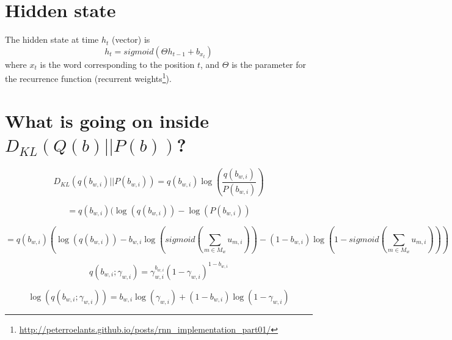 \documentclass[11pt]{article}
\begin{document}
\section{Hidden state}
The hidden state at time $h_t$ (vector) is
$$
h_t = sigmoid(\Theta h_{t-1} + b_{x_t})
$$
where $x_t$ is the word corresponding to the position $t$, and $\Theta$ is the parameter for the recurrence function (recurrent weights\footnote{\url{http://peterroelants.github.io/posts/rnn_implementation_part01/}}).

\section{What is going on inside $D_{KL}(Q(b)||P(b))$?}

$$
D_{KL}(q(b_{w,i}) || P(b_{w,i})) = q(b_{w,i}) \log(\frac{q(b_{w,i})}{P(b_{w,i})})
$$

$$
= q(b_{w,i}) (\log(q(b_{w,i})) - \log(P(b_{w,i}))
$$

$$
= q(b_{w,i}) (\log(q(b_{w,i})) - b_{w,i} \log(sigmoid(\sum_{m \in M_w} u_{m,i})) - (1 - b_{w,i}) \log(1 - sigmoid(\sum_{m \in M_w} u_{m,i})))
$$


$$
q(b_{w,i};\gamma_{w,i}) = \gamma_{w,i}^{b_{w,i}} (1 - \gamma_{w,i})^{1 - b_{w,i}}
$$

$$
 \log(q(b_{w,i};\gamma_{w,i})) = b_{w,i}\log(\gamma_{w,i}) + (1 - b_{w,i})\log(1 - \gamma_{w,i})
$$







\end{document}
